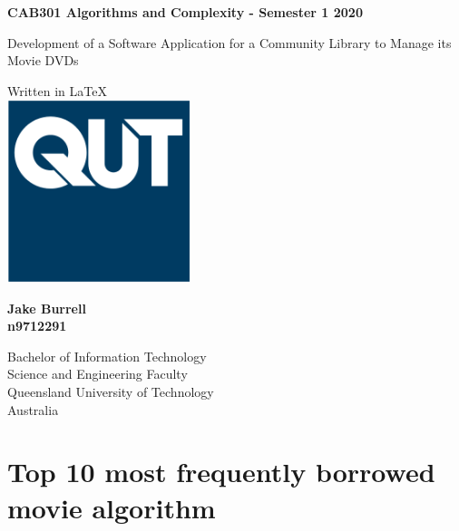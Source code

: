 \documentclass[a4paper,12pt]{article}
\begin{document}
\begin{titlepage}
   \begin{center}
       \vspace*{1cm}
 
       \textbf{CAB301 Algorithms and Complexity - Semester 1 2020}
 
       \vspace{0.5cm}
        \LARGE{Development of a Software Application for a Community Library to Manage its Movie DVDs}
 
       \vspace{1.5cm}

       \vfill
       
       \vspace{0.8cm}
       \normalsize
 	   Written in \LaTeX \\
       \includegraphics[width=0.4\textwidth]{QUT}

       \large
       \textbf{Jake Burrell}\\
       \textbf{n9712291}

       \vspace{1.5cm}
 
       \normalsize
 	   Bachelor of Information Technology\\
       Science and Engineering Faculty\\
       Queensland University of Technology\\
       Australia\\ 
   \end{center}
\end{titlepage}

\section{Top 10 most frequently borrowed movie algorithm}
\end{document}
